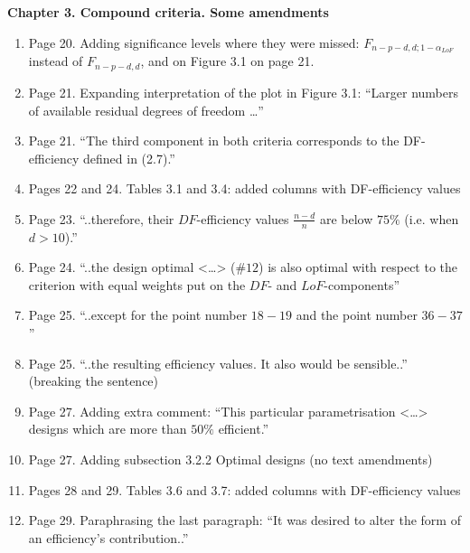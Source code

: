 \documentclass[11pt,a4paper,oneside]{article}
\begin{document}
\textbf{Chapter 3. Compound criteria. Some amendments}
\begin{enumerate}
\item Page 20. Adding significance levels where they were missed: $F_{n-p-d,d;1-\alpha_{LoF}}$ instead of $F_{n-p-d,d}$, and on Figure 3.1 on page 21.
\item Page 21. Expanding interpretation of the plot in Figure 3.1: ``Larger numbers of available residual degrees of freedom \ldots'' 
\item Page 21. ``The third component in both criteria corresponds to the DF-efficiency defined in (2.7).''
\item Pages 22 and 24. Tables 3.1 and 3.4: added columns with DF-efficiency values
\item Page 23. ``..therefore, their $DF$-efficiency values $\frac{n-d}{n}$ are below $75\%$ (i.e. when $d>10$).'' 
\item Page 24. ``..the design optimal <\ldots> (\#$12$) is also optimal with respect to the criterion with equal weights put on the $DF$- and $LoF$-components'' 
\item Page 25. ``..except for the point number $18-19$ and the point number $36-37$''
\item Page 25. ``..the resulting efficiency values. It also would be sensible..'' (breaking the sentence)
\item Page 27. Adding extra comment: ``This particular parametrisation <\ldots> designs which are more than $50\%$ efficient.''
\item Page 27. Adding subsection 3.2.2 Optimal designs (no text amendments)
\item Pages 28 and 29.  Tables 3.6 and 3.7: added columns with DF-efficiency values
\item Page 29. Paraphrasing the last paragraph: ``It was desired to alter the form of an efficiency's contribution..''
\end{enumerate}
\end{document}
